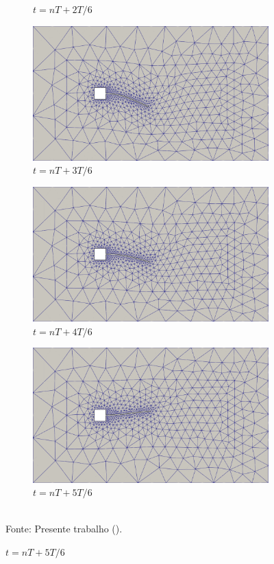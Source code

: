\begin{figure}[h!]
\begin{subfigure}[b]{0.49\textwidth}
        \caption{$t=nT+2T/6$}
    \end{subfigure}
    \begin{subfigure}[b]{0.49\textwidth}
        \includegraphics[width=\linewidth]{Figuras/FSI-prism2/mT4.png}
        \caption{$t=nT+3T/6$}
    \end{subfigure}
    \begin{subfigure}[b]{0.49\textwidth}
        \includegraphics[width=\linewidth]{Figuras/FSI-prism2/mT5.png}
        \caption{$t=nT+4T/6$}
    \end{subfigure}
    \begin{subfigure}[b]{0.49\textwidth}
        \includegraphics[width=\linewidth]{Figuras/FSI-prism2/mT6.png}
        \caption{$t=nT+5T/6$}
    \end{subfigure}
    \\Fonte: Presente trabalho (\the\year).
    \label{fig:prismMesh2}
\end{figure}
\newpage

